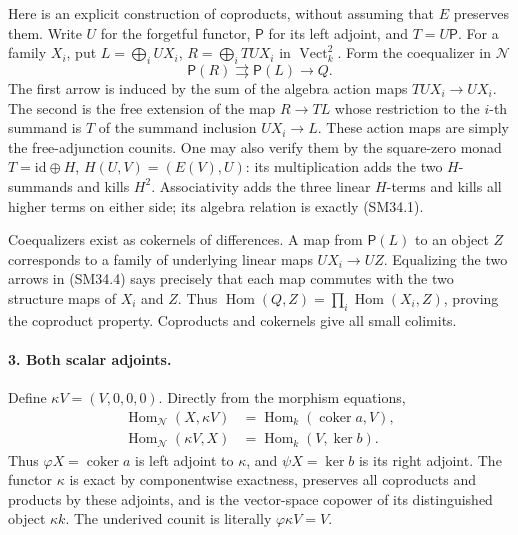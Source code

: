 Here is an explicit construction of coproducts, without
assuming that \(E\) preserves them.  Write \(U\) for the
forgetful functor, \(\mathsf P\) for its left adjoint, and
\(T=U\mathsf P\).  For a family \(X_i\), put
\(L=\bigoplus_iUX_i\), \(R=\bigoplus_iTUX_i\) in
\(\operatorname{Vect}_k^2\).  Form the coequalizer in
\(\mathcal N\)
\[
             \mathsf P(R)\rightrightarrows\mathsf P(L)
                                      \longrightarrow Q.     \tag{SM34.4}
\]
The first arrow is induced by the sum of the algebra action
maps \(TUX_i\to UX_i\).  The second is the free extension
of the map \(R\to T L\) whose restriction to the \(i\)-th
summand is \(T\) of the summand inclusion \(UX_i\to L\).
These action maps are simply the free-adjunction counits.
One may also verify them by the square-zero monad
\(T=\mathrm{id}\oplus H\), \(H(U,V)=(E(V),U)\): its
multiplication adds the two \(H\)-summands and kills
\(H^2\).  Associativity adds the three linear \(H\)-terms
and kills all higher terms on either side; its algebra
relation is exactly (SM34.1).

Coequalizers exist as cokernels of differences.  A map from
\(\mathsf P(L)\) to an object \(Z\) corresponds to a family
of underlying linear maps \(UX_i\to UZ\).  Equalizing the
two arrows in (SM34.4) says precisely that each map commutes
with the two structure maps of \(X_i\) and \(Z\).
Thus \(\operatorname{Hom}(Q,Z)=\prod_i
\operatorname{Hom}(X_i,Z)\), proving the coproduct property.
Coproducts and cokernels give all small colimits.

\paragraph{3. Both scalar adjoints.}
Define \(\kappa V=(V,0,0,0)\).  Directly from the
morphism equations,
\[
 \begin{split}
 \operatorname{Hom}_{\mathcal N}(X,\kappa V)
       &=\operatorname{Hom}_k(\operatorname{coker}a,V),\\
 \operatorname{Hom}_{\mathcal N}(\kappa V,X)
       &=\operatorname{Hom}_k(V,\ker b).
 \end{split}                                                 \tag{SM34.5}
\]
Thus \(\varphi X=\operatorname{coker}a\) is left adjoint
to \(\kappa\), and \(\psi X=\ker b\) is its right
adjoint.  The functor \(\kappa\) is exact by componentwise
exactness, preserves all coproducts and products by these
adjoints, and is the vector-space copower of its distinguished
object \(\kappa k\).  The underived counit is literally
\(\varphi\kappa V=V\).


